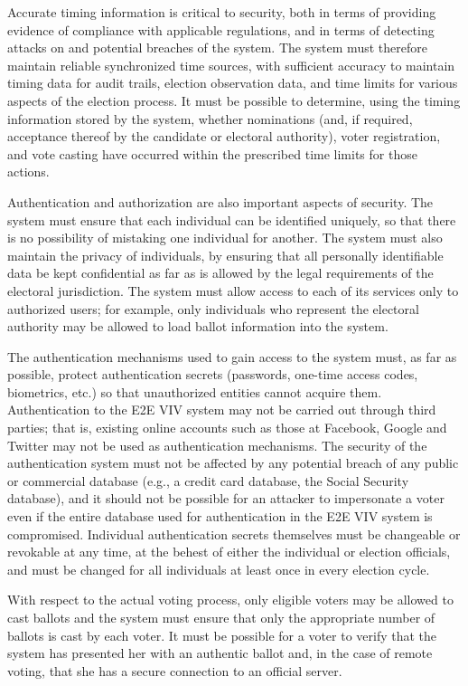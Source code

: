 Accurate timing information is critical to security, both in terms of
providing evidence of compliance with applicable regulations, and in
terms of detecting attacks on and potential breaches of the
system. The system must therefore maintain reliable synchronized time
sources, with sufficient accuracy to maintain timing data for audit
trails, election observation data, and time limits for various aspects
of the election process. It must be possible to determine, using the
timing information stored by the system, whether nominations (and, if
required, acceptance thereof by the candidate or electoral authority),
voter registration, and vote casting have occurred within the
prescribed time limits for those actions.

Authentication and authorization are also important aspects of
security. The system must ensure that each individual can be
identified uniquely, so that there is no possibility of mistaking one
individual for another. The system must also maintain the privacy of
individuals, by ensuring that all personally identifiable data be kept
confidential as far as is allowed by the legal requirements of the
electoral jurisdiction. The system must allow access to each of its
services only to authorized users; for example, only individuals who
represent the electoral authority may be allowed to load ballot
information into the system.

The authentication mechanisms used to gain access to the system must,
as far as possible, protect authentication secrets (passwords,
one-time access codes, biometrics, etc.) so that unauthorized entities
cannot acquire them. Authentication to the E2E VIV system may not be
carried out through third parties; that is, existing online accounts
such as those at Facebook, Google and Twitter may not be used as
authentication mechanisms. The security of the authentication system
must not be affected by any potential breach of any public or
commercial database (e.g., a credit card database, the Social Security
database), and it should not be possible for an attacker to
impersonate a voter even if the entire database used for
authentication in the E2E VIV system is compromised. Individual
authentication secrets themselves must be changeable or revokable at
any time, at the behest of either the individual or election
officials, and must be changed for all individuals at least once in
every election cycle.

With respect to the actual voting process, only eligible voters may be
allowed to cast ballots and the system must ensure that only the
appropriate number of ballots is cast by each voter. It must be
possible for a voter to verify that the system has presented her with
an authentic ballot and, in the case of remote voting, that she has a
secure connection to an official server. 

